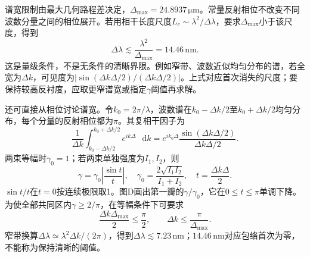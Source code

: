 \documentclass[UTF8,fontset=fandol,a4paper,11pt]{ctexart}
\newcommand{\dd}{\mathop{}\!\mathrm{d}}
\begin{document}
谱宽限制由最大几何路程差决定，$\Delta_{\max}=24.8937\,\mathrm{\mu m}$。常量反射相位不改变不同波数分量之间的相位展开。若用相干长度尺度$L_c\sim\lambda^2/\Delta\lambda$，要求$\Delta_{\max}$小于该尺度，得到
\[
\boxed{\Delta\lambda\lesssim\frac{\lambda^2}{\Delta_{\max}}
=14.46\,\mathrm{nm}}.
\]
这是量级条件，不是无条件的清晰界限。例如窄带、波数近似均匀分布的谱，若全宽为$\Delta k$，可见度为$|\sin(\Delta k\Delta/2)/(\Delta k\Delta/2)|$。上式对应首次消失的尺度；要保持较高反衬度，应取更窄谱宽或指定$\gamma$阈值再求解。

还可直接从相位讨论谱宽。令$k_0=2\pi/\lambda$，波数谱在$k_0-\Delta k/2$至$k_0+\Delta k/2$均匀分布，每个分量的反射相位都为$\pi$。其复相干因子为
\[
\frac1{\Delta k}\int_{k_0-\Delta k/2}^{k_0+\Delta k/2}
e^{ik\Delta}\,\dd k
=e^{ik_0\Delta}\frac{\sin(\Delta k\Delta/2)}{\Delta k\Delta/2}.
\]
两束等幅时$\gamma_0=1$；若两束单独强度为$I_1,I_2$，则
\[
\gamma=\gamma_0\left|\frac{\sin t}{t}\right|,\quad
\gamma_0=\frac{2\sqrt{I_1I_2}}{I_1+I_2},\quad t=\frac{\Delta k\Delta}{2}.
\]
$\sin t/t$在$t=0$按连续极限取1。图D画出第一瓣的$\gamma/\gamma_0$，它在$0\le t\le\pi$单调下降。为使全部共同区内$\gamma\ge2/\pi$，在等幅条件下可要求
\[
\frac{\Delta k\Delta_{\max}}2\le\frac\pi2,\qquad
\Delta k\le\frac{\pi}{\Delta_{\max}}.
\]
窄带换算$\Delta\lambda\simeq\lambda^2\Delta k/(2\pi)$，得到$\Delta\lambda\lesssim7.23\,\mathrm{nm}$；$14.46\,\mathrm{nm}$对应包络首次为零，不能称为保持清晰的阈值。
\end{document}
